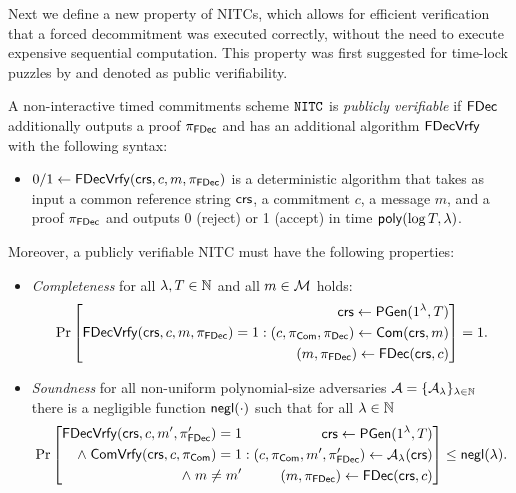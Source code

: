 Next we define a new property of NITCs, which allows for efficient verification that a forced decommitment was executed correctly, without the need to execute expensive sequential computation. This property was first suggested for time-lock puzzles by \cite{EPRINT:EFKP20a} and denoted as public verifiability.

\begin{definition}
\label{def:nitc_pubver}
A non-interactive timed commitments scheme $\mathtt{NITC}$ is \emph{publicly verifiable} if $\mathsf{FDec}$ additionally outputs a proof $\pi_{\mathsf{FDec}}$ and has an additional algorithm $\mathsf{FDecVrfy}$ with the following syntax:
\begin{itemize}
\item $0/1 \leftarrow \mathsf{FDecVrfy}(\mathsf{crs}, c, m, \pi_{\mathsf{FDec}})$ is a deterministic algorithm that takes as input a common reference string $\mathsf{crs}$, a commitment $c$, a message $m$, and a proof $\pi_{\mathsf{FDec}}$ and outputs 0 (reject) or 1 (accept) in time $\mathsf{poly}(\log T, \lambda)$.
\end{itemize}
Moreover, a publicly verifiable NITC must have the following properties:
\begin{itemize}
\item \emph{Completeness} for all $\lambda, T \in \mathbb{N}$ and all $m \in \mathcal{M}$ holds:
\[\Pr\left[
\begin{aligned}
\mathsf{FDecVrfy}(\mathsf{crs}, c, m, \pi_{\mathsf{FDec}})=1
\end{aligned}
: 
\begin{aligned}
      \mathsf{crs} \leftarrow \mathsf{PGen}(1{^{\lambda}}, T) \\
      (c, \pi_{\mathsf{Com}}, \pi_{\mathsf{Dec}}) \leftarrow \mathsf{Com}(\mathsf{crs}, m) \\
      (m, \pi_{\mathsf{FDec}}) \leftarrow \mathsf{FDec}(\mathsf{crs}, c) \\
    \end{aligned}
\right] = 1.
\]
\item \emph{Soundness} for all non-uniform polynomial-size adversaries $\mathcal{A} = \{\mathcal{A}_{\lambda}\}_{\lambda \in \mathbb{N}}$ there is a negligible function $\mathsf{negl}(\cdot)$ such that for all $\lambda \in \mathbb{N}$
\[\Pr\left[
\begin{aligned}
\mathsf{FDecVrfy}(\mathsf{crs}, c, m', \pi_{\mathsf{FDec}}') = 1 \\
 \land \; \mathsf{ComVrfy}(\mathsf{crs}, c, \pi_{\mathsf{Com}}) = 1 \\
\land \; m \neq m' \\
\end{aligned}
: 
\begin{aligned}
      \mathsf{crs} \leftarrow \mathsf{PGen}(1{^{\lambda}}, T) \\
      (c, \pi_{\mathsf{Com}}, m', \pi_{\mathsf{FDec}}') \leftarrow \mathcal{A}_{\lambda}(\mathsf{crs}) \\
      (m,\pi_{\mathsf{FDec}}) \leftarrow \mathsf{FDec}(\mathsf{crs},c)
    \end{aligned}
\right] \leq \mathsf{negl}(\lambda).
\]
\end{itemize}

\end{definition}

